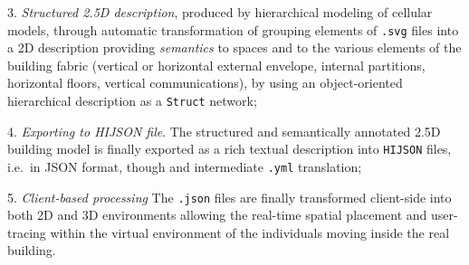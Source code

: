 3. \textit{Structured 2.5D description}, produced by
  hierarchical modeling of cellular models, through automatic transformation of  grouping elements of \texttt{.svg} files into a 2D description providing \emph{semantics} to spaces and  to the various elements of the building fabric (vertical or horizontal external envelope, internal partitions, horizontal floors, vertical communications), by using an object-oriented hierarchical description as a  \texttt{Struct} network;

4. \textit{Exporting to HIJSON file}.
The  structured and semantically annotated 2.5D building model is finally  exported as a rich textual description into \texttt{HIJSON} files, i.e.~in JSON format, though and intermediate \texttt{.yml} translation;

5. \textit{Client-based processing}
  The \texttt{.json} files are finally transformed client-side into both
  2D and 3D environments allowing the real-time spatial placement and
  user-tracing within the virtual environment of the individuals moving
  inside the real building.


